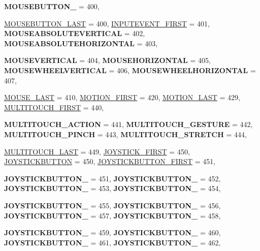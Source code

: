\begin{DoxyCompactItemize}
{\bfseries MOUSEBUTTON\_} =  400, 
\par
\hyperlink{classphys_1_1MetaCode_a3e501cbb5bf0f6f1fdb7211465bda8d8afb041b448e08ff29bccec2349fbec97b}{MOUSEBUTTON\_\-LAST} =  400, 
\hyperlink{classphys_1_1MetaCode_a3e501cbb5bf0f6f1fdb7211465bda8d8a87685f9ca9462b329f2b86a17514f136}{INPUTEVENT\_\-FIRST} =  401, 
{\bfseries MOUSEABSOLUTEVERTICAL} =  402, 
{\bfseries MOUSEABSOLUTEHORIZONTAL} =  403, 
\par
{\bfseries MOUSEVERTICAL} =  404, 
{\bfseries MOUSEHORIZONTAL} =  405, 
{\bfseries MOUSEWHEELVERTICAL} =  406, 
{\bfseries MOUSEWHEELHORIZONTAL} =  407, 
\par
\hyperlink{classphys_1_1MetaCode_a3e501cbb5bf0f6f1fdb7211465bda8d8aeb3dc7f5f5d3e0948ebbe5c319760897}{MOUSE\_\-LAST} =  410, 
\hyperlink{classphys_1_1MetaCode_a3e501cbb5bf0f6f1fdb7211465bda8d8a355649b334e903ada2496ad39dcd5f9d}{MOTION\_\-FIRST} =  420, 
\hyperlink{classphys_1_1MetaCode_a3e501cbb5bf0f6f1fdb7211465bda8d8a59cc92f5b2f42f7a138f8ea22e92d626}{MOTION\_\-LAST} =  429, 
\hyperlink{classphys_1_1MetaCode_a3e501cbb5bf0f6f1fdb7211465bda8d8acdb03d23d93022d5962db5026475b9c7}{MULTITOUCH\_\-FIRST} =  440, 
\par
{\bfseries MULTITOUCH\_\-ACTION} =  441, 
{\bfseries MULTITOUCH\_\-GESTURE} =  442, 
{\bfseries MULTITOUCH\_\-PINCH} =  443, 
{\bfseries MULTITOUCH\_\-STRETCH} =  444, 
\par
\hyperlink{classphys_1_1MetaCode_a3e501cbb5bf0f6f1fdb7211465bda8d8a74243856f76001ba95b32cc575af3255}{MULTITOUCH\_\-LAST} =  449, 
\hyperlink{classphys_1_1MetaCode_a3e501cbb5bf0f6f1fdb7211465bda8d8a666e564cae666de739b9b3cf047ec578}{JOYSTICK\_\-FIRST} =  450, 
\hyperlink{classphys_1_1MetaCode_a3e501cbb5bf0f6f1fdb7211465bda8d8aaaa2af6a60a9cd7403aa4786ef1ea389}{JOYSTICKBUTTON} =  450, 
\hyperlink{classphys_1_1MetaCode_a3e501cbb5bf0f6f1fdb7211465bda8d8a88e7d7302a93326fdcc2181f96dc878e}{JOYSTICKBUTTON\_\-FIRST} =  451, 
\par
{\bfseries JOYSTICKBUTTON\_} =  451, 
{\bfseries JOYSTICKBUTTON\_} =  452, 
{\bfseries JOYSTICKBUTTON\_} =  453, 
{\bfseries JOYSTICKBUTTON\_} =  454, 
\par
{\bfseries JOYSTICKBUTTON\_} =  455, 
{\bfseries JOYSTICKBUTTON\_} =  456, 
{\bfseries JOYSTICKBUTTON\_} =  457, 
{\bfseries JOYSTICKBUTTON\_} =  458, 
\par
{\bfseries JOYSTICKBUTTON\_} =  459, 
{\bfseries JOYSTICKBUTTON\_} =  460, 
{\bfseries JOYSTICKBUTTON\_} =  461, 
{\bfseries JOYSTICKBUTTON\_} =  462, 
\par

\end{DoxyCompactItemize}
